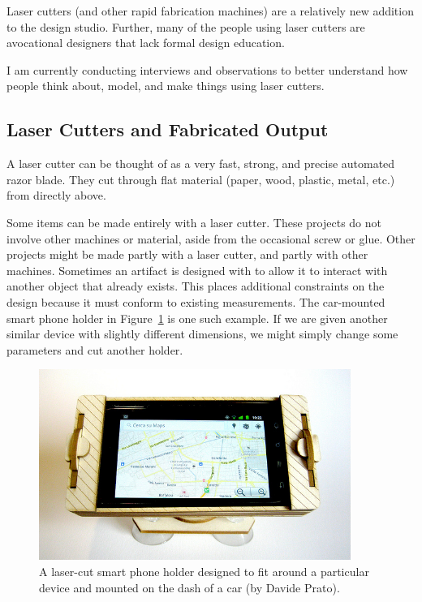 \documentclass[11pt]{article}
\begin{document}
Laser cutters (and other rapid fabrication machines) are a relatively
new addition to the design studio. Further, many of the people using
laser cutters are avocational designers that lack formal design
education.

I am currently conducting interviews and observations to better
understand how people think about, model, and make things using laser
cutters. 

\subsection{Laser Cutters and Fabricated Output}

A laser cutter can be thought of as a very fast, strong, and precise
automated razor blade. They cut through flat material (paper, wood,
plastic, metal, etc.) from directly above.

Some items can be made entirely with a laser cutter. These projects do
not involve other machines or material, aside from the occasional
screw or glue. Other projects might be made partly with a laser
cutter, and partly with other machines. Sometimes an artifact is
designed with to allow it to interact with another object that already
exists. This places additional constraints on the design because it
must conform to existing measurements. The car-mounted smart phone
holder in Figure~\ref{fig:phone-holder} is one such example. If we are
given another similar device with slightly different dimensions, we
might simply change some parameters and cut another holder.

\begin{figure}[h] %
   \centering
   \includegraphics[width=4in]{img/phone-holder.jpg} 
   \caption{A laser-cut smart phone holder designed to fit around a
     particular device and mounted on the dash of a car (by Davide
     Prato).}
   \label{fig:phone-holder}
\end{figure}
\end{document}
